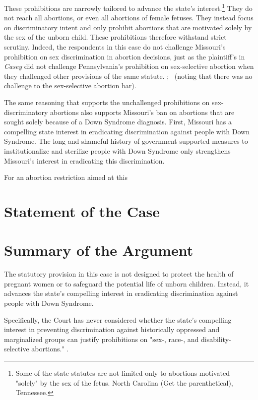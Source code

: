 \documentclass[12pt,\documentclassflag]{SCOTUS_Brief}
\begin{document}
These prohibitions are narrowly tailored to advance the state's interest.\footnote{Some of the state statutes are not limited only to abortions motivated "solely" by the sex of the fetus. \Seeeg North Carolina (Get the parenthetical), Tennessee. } They do not reach all abortions, or even all abortions of female fetuses. They instead focus on discriminatory intent and only prohibit abortions that are motivated solely by the sex of the unborn child. These prohibitions therefore withstand strict scrutiny. Indeed, the respondents in this case do not challenge Missouri's prohibition on sex discrimination in abortion decisions, just as the plaintiff's in \textit{Casey} \cite[!]{Casey} did not challenge Pennsylvania's prohibition on sex-selective abortion when they challenged other provisions of the same statute. \See  {}; \seealso {}~(noting that there was no challenge to the sex-selective abortion bar).

The same reasoning that supports the unchallenged prohibitions on sex-discriminatory abortions also supports Missouri's ban on abortions that are sought solely because of a Down Syndrome diagnosis. First, Missouri has a compelling state interest in eradicating discrimination against people with Down Syndrome. The long and shameful history of government-supported measures to institutionalize and sterilize people with Down Syndrome only strengthens Missouri's interest in eradicating this discrimination.

For an abortion restriction aimed at this 

\section{Statement of the Case}

\section{Summary of the Argument}

The statutory provision in this case is not designed to protect the health of pregnant women or to safeguard the potential life of unborn children. Instead, it advances the state's compelling interest in eradicating discrimination against people with Down Syndrome. 

Specifically, the Court has never considered whether the state's compelling interest in preventing discrimination against historically oppressed and marginalized groups can justify prohibitions on "sex-, race-, and disability-selective abortions." .
\end{document}
